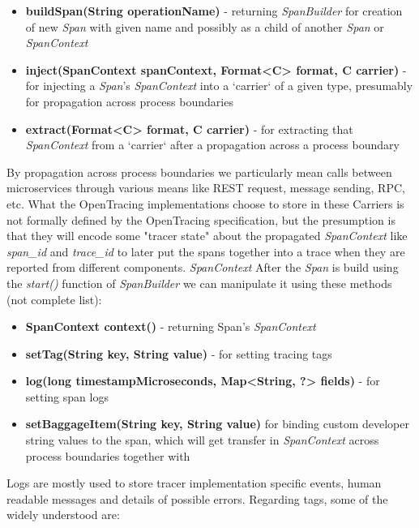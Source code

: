 \documentclass[12pt,oneside]{fithesis2}
\begin{document}
\begin{itemize}
\item \textbf{buildSpan(String operationName)} - returning \textit{SpanBuilder} for creation of new \textit{Span} with given name and possibly as a child of another \textit{Span} or \textit{SpanContext}
\item \textbf{inject(SpanContext spanContext, Format<C> format, C carrier)} - for injecting a \textit{Span}'s \textit{SpanContext} into a `carrier` of a given type, presumably for propagation across process boundaries
\item \textbf{extract(Format<C> format, C carrier)} - for extracting that \textit{SpanContext} from a `carrier` after a propagation across a process boundary
\end{itemize}

By propagation across process boundaries we particularly mean calls between microservices through various means like REST request, message sending, RPC, etc. What the OpenTracing implementations choose to store in these Carriers is not formally defined by the OpenTracing specification, but the presumption is that they will encode some "tracer state" about the propagated \textit{SpanContext} like \textit{span\_id} and \textit{trace\_id} to later put the spans together into a trace when they are reported from different components. \textit{SpanContext} After the \textit{Span} is build using the \textit{start()} function of \textit{SpanBuilder} we can manipulate it using these methods (not complete list):

\begin{itemize}
\item \textbf{SpanContext context()} - returning Span's \textit{SpanContext}
\item \textbf{setTag(String key, String value)} - for setting tracing tags
\item \textbf{log(long timestampMicroseconds, Map<String, ?> fields)} - for setting span logs
\item \textbf{setBaggageItem(String key, String value)} for binding custom developer string values to the span, which will get transfer in \textit{SpanContext} across process boundaries together with 
\end{itemize}

Logs are mostly used to store tracer implementation specific events, human readable messages and details of possible errors. Regarding tags, some of the widely understood are\cite{opentracing_spec}:
\end{document}
